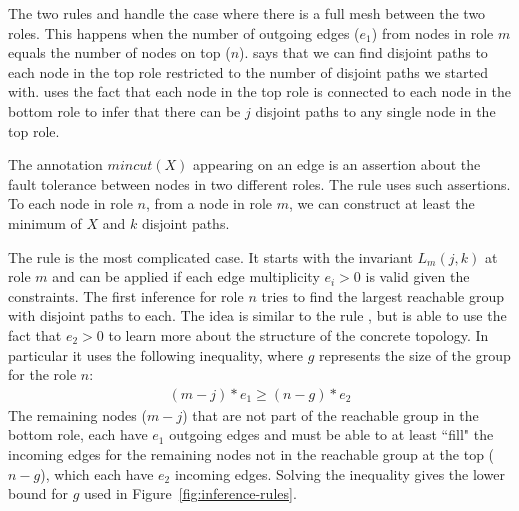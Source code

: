 \documentclass[numbers, 10pt, preprint]{sigplanconf}
\newcommand{\Mincut}{\mathit{mincut}}
\begin{document}

The two rules  and  handle the case where there is a full mesh between the two roles. This happens when the number of outgoing edges ($e_1$) from nodes in role $m$ equals the number of nodes on top ($n$).  says that we can find disjoint paths to each node in the top role restricted to the number of disjoint paths we started with.  uses the fact that each node in the top role is connected to each node in the bottom role to infer that there can be $j$ disjoint paths to any single node in the top role.

The annotation $\Mincut(X)$ appearing on an edge is an assertion about the fault tolerance between nodes in two different roles. The rule  uses such assertions. To each node in role $n$, from a node in role $m$, we can construct at least the minimum of $X$ and $k$ disjoint paths.


The rule  is the most complicated case.
It starts with the invariant $L_m(j,k)$ at role $m$ and can be applied if each edge multiplicity $e_i > 0$ is valid given the constraints. The first inference for role $n$ tries to find the largest reachable group with disjoint paths to each. The idea is similar to the rule , but is able to use the fact that $e_2 > 0$ to learn more about the structure of the concrete topology. In particular it uses the following inequality, where $g$ represents the size of the group for the role $n$:
%
\[ \begin{array}{c}
  (m-j)*e_1 \geq (n-g)*e_2
\end{array} \]
\noindent
%
The remaining nodes ($m-j$) that are not part of the reachable group in the bottom role, each have $e_1$ outgoing edges and must be able to at least ``fill" the incoming edges for the remaining nodes not in the reachable group at the top ($n-g$), which each have $e_2$ incoming edges. Solving the inequality gives the lower bound for $g$ used in Figure~\ref{fig:inference-rules}.
\end{document}
